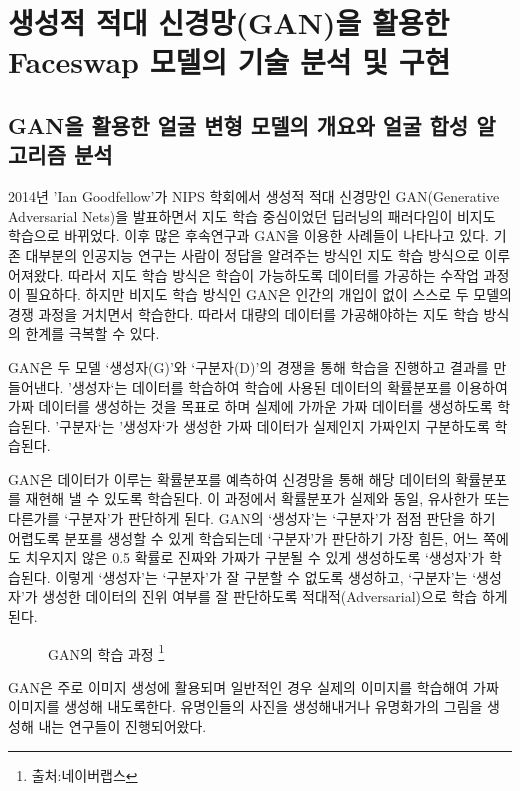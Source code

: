 \chapter{ 생성적 적대 신경망(GAN)을 활용한 Faceswap 모델의 기술 분석 및 구현}


\section{ GAN을 활용한 얼굴 변형 모델의 개요와 얼굴 합성 알고리즘 분석}
2014년 'Ian Goodfellow'가 NIPS 학회에서 생성적 적대 신경망인 GAN(Generative Adversarial Nets)을 발표하면서 지도 학습 중심이었던 딥러닝의 패러다임이 비지도 학습으로 바뀌었다. 이후 많은 후속연구과 GAN을 이용한 사례들이 나타나고 있다. 기존 대부분의 인공지능 연구는 사람이 정답을 알려주는 방식인 지도 학습 방식으로 이루어져왔다. 따라서 지도 학습 방식은 학습이 가능하도록 데이터를 가공하는 수작업 과정이 필요하다. 하지만 비지도 학습 방식인 GAN은 인간의 개입이 없이 스스로 두 모델의 경쟁 과정을 거치면서 학습한다. 따라서 대량의 데이터를 가공해야하는 지도 학습 방식의 한계를 극복할 수 있다.

GAN은 두 모델 ‘생성자(G)’와 ‘구분자(D)’의 경쟁을 통해 학습을 진행하고 결과를 만들어낸다. '생성자‘는 데이터를 학습하여 학습에 사용된 데이터의 확률분포를 이용하여 가짜 데이터를 생성하는 것을 목표로 하며 실제에 가까운 가짜 데이터를 생성하도록 학습된다. ’구분자‘는 ’생성자‘가 생성한 가짜 데이터가 실제인지 가짜인지 구분하도록 학습된다.

GAN은 데이터가 이루는 확률분포를 예측하여 신경망을 통해 해당 데이터의 확률분포를 재현해 낼 수 있도록 학습된다. 이 과정에서 확률분포가 실제와 동일, 유사한가 또는 다른가를 ‘구분자’가 판단하게 된다. GAN의 ‘생성자’는 ‘구분자’가 점점 판단을 하기 어렵도록 분포를 생성할 수 있게 학습되는데 ‘구분자’가 판단하기 가장 힘든, 어느 쪽에도 치우지지 않은 0.5 확률로 진짜와 가짜가 구분될 수 있게 생성하도록 ‘생성자’가 학습된다. 이렇게 ‘생성자’는 ‘구분자’가 잘 구분할 수 없도록 생성하고, ‘구분자’는 ‘생성자’가 생성한 데이터의 진위 여부를 잘 판단하도록 적대적(Adversarial)으로 학습 하게 된다.

\begin{figure}[h!]
\centering
\caption{GAN의 학습 과정 \protect\footnote{출처:네이버랩스}}
\end{figure}



GAN은 주로 이미지 생성에 활용되며 일반적인 경우 실제의 이미지를 학습해여 가짜 이미지를 생성해 내도록한다. 유명인들의 사진을 생성해내거나 유명화가의 그림을 생성해 내는 연구들이 진행되어왔다.

